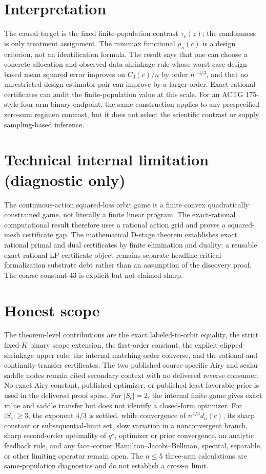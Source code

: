 \documentclass{article}
\begin{document}
\section{Interpretation}

The causal target is the fixed finite-population contrast \(\tau_c(z)\); the randomness is only treatment assignment. The minimax functional \(\rho_n(c)\) is a design criterion, not an identification formula. The result says that one can choose a concrete allocation and observed-data shrinkage rule whose worst-case design-based mean squared error improves on \(C_0(c)/n\) by order \(n^{-4/3}\), and that no unrestricted design-estimator pair can improve by a larger order. Exact-rational certificates can audit the finite-population value at this scale. For an ACTG 175-style four-arm binary endpoint, the same construction applies to any prespecified zero-sum regimen contrast, but it does not select the scientific contrast or supply sampling-based inference.

\section*{Technical internal limitation (diagnostic only)}

The continuous-action squared-loss orbit game is a finite convex quadratically constrained game, not literally a finite linear program. The exact-rational computational result therefore uses a rational action grid and proves a squared-mesh certificate gap. The mathematical D-stage theorem establishes exact rational primal and dual certificates by finite elimination and duality; a reusable exact-rational LP certificate object remains separate headline-critical formalization substrate debt rather than an assumption of the discovery proof. The coarse constant \(43\) is explicit but not claimed sharp.

\section{Honest scope}

The theorem-level contributions are the exact labeled-to-orbit equality, the strict fixed-\(K\) binary scope extension, the first-order constant, the explicit clipped-shrinkage upper rule, the internal matching-order converse, and the rational and continuity-transfer certificates. The two published source-specific Airy and scalar-saddle nodes remain cited secondary context with no delivered reverse consumer. No exact Airy constant, published optimizer, or published least-favorable prior is used in the delivered proof spine. For \(|S_c|=2\), the internal finite game gives exact value and saddle transfer but does not identify a closed-form optimizer. For \(|S_c|\geq3\), the exponent \(4/3\) is settled, while convergence of \(n^{4/3}d_n(c)\), its sharp constant or subsequential-limit set, slow variation in a nonconvergent branch, sharp second-order optimality of \(q^\star\), optimizer or prior convergence, an analytic feedback rule, and any face--corner Hamilton--Jacobi--Bellman, spectral, separable, or other limiting operator remain open. The \(n\leq5\) three-arm calculations are same-population diagnostics and do not establish a cross-\(n\) limit.
\end{document}
